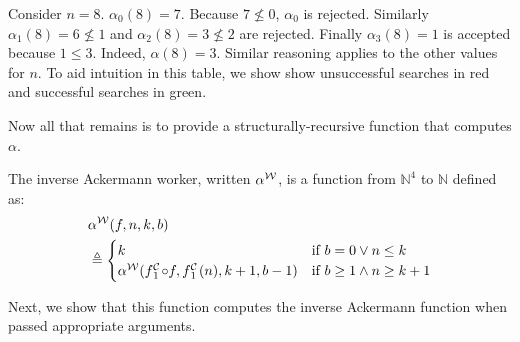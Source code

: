 Consider $n = 8$. $\alpha_{0}(8) = 7$. Because $7 \not\le 0$, $\alpha_0$ is rejected.
Similarly $\alpha_{1}(8) = 6 \not\le 1$ and $\alpha_{2}(8) = 3 \not\le 2$
are rejected. Finally $\alpha_{3}(8) = 1$ is accepted because $1 \le 3$. 
Indeed, $\alpha(8) = 3$.
Similar reasoning applies to the other values for $n$. To aid intuition in this table,
we show show unsuccessful searches in {\color{red}red} and successful searches in 
{\color{green}green}.

Now all that remains is to provide a structurally-recursive function that computes $\alpha$.
\begin{defn} \label{defn: inv-ack-worker}
	The inverse Ackermann worker, written $\alpha^{\mathcal{W}}$, is a function from $\mathbb{N}^4$ to $\mathbb{N}$ defined as: %
	\begin{equation} \label{eq: inv-ack-worker-recursion}
	\begin{aligned}
	& \alpha^{\W}(f, n, k, b) \\ 
	& \triangleq \begin{cases}
	k & \text{if } b = 0 \vee n\le k \\ \alpha^{\W}(\cdt{f}{1}\circ f , \cdt{f}{1}(n), k+1, b-1) & \text{if } b \ge 1 \wedge n \ge k+1
	\end{cases}
		\end{aligned}
	\end{equation}
\end{defn}
\noindent Next, we show that this function computes the inverse Ackermann function when passed appropriate arguments.
